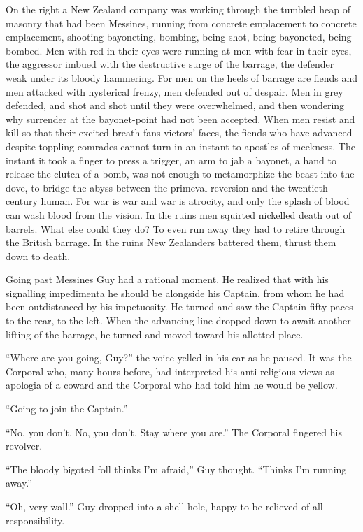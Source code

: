 On the right a New Zealand company was working through the tumbled heap of masonry that had been Messines, running from concrete emplacement to concrete emplacement, shooting bayoneting, bombing, being shot, being bayoneted, being bombed. Men with red in their eyes were running at men with fear in their eyes, the aggressor imbued with the destructive surge of the barrage, the defender weak under its bloody hammering. For men on the heels of barrage are fiends and men attacked with hysterical frenzy, men defended out of despair. Men in grey defended, and shot and shot until they were overwhelmed, and then wondering why surrender at the bayonet-point had not been accepted. When men resist and kill so that their excited breath fans victors' faces, the fiends who have advanced despite toppling comrades cannot turn in an instant to apostles of meekness. The instant it took a finger to press a trigger, an arm to jab a bayonet, a hand to release the clutch of a bomb, was not enough to metamorphize the beast into the dove, to bridge the abyss between the primeval reversion and the twentieth-century human. For war is war and war is atrocity, and only the splash of blood can wash blood from the vision. In the ruins men squirted nickelled death out of barrels. What else could they do? To even run away they had to retire through the British barrage. In the ruins New Zealanders battered them, thrust them down to death.

Going past Messines Guy had a rational moment. He realized that with his signalling impedimenta he should be alongside his Captain, from whom he had been outdistanced by his impetuosity. He turned and saw the Captain fifty paces to the rear, to the left. When the advancing line dropped down to await another lifting of the barrage, he turned and moved toward his allotted place.

``Where are you going, Guy?'' the voice yelled in his ear as he paused. It was the Corporal who, many hours before, had interpreted his anti-religious views as apologia of a coward and the Corporal who had told him he would be yellow.

``Going to join the Captain.''

``No, you don't. No, you don't. Stay where you are.'' The Corporal fingered his revolver.

``The bloody bigoted foll thinks I'm afraid,'' Guy thought. ``Thinks I'm running away.''

``Oh, very wall.'' Guy dropped into a shell-hole, happy to be relieved of all responsibility.

